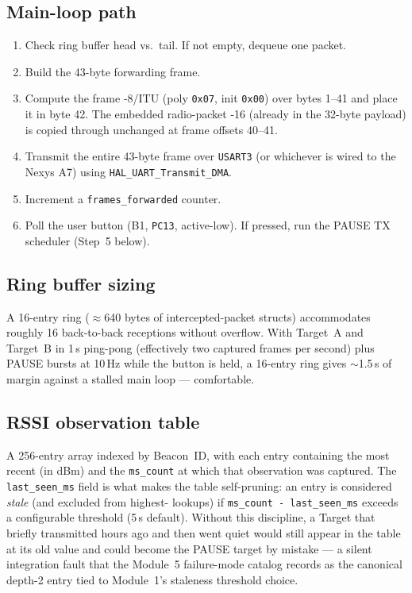 \documentclass[11pt,letterpaper]{article}
\begin{document}
\subsection{Main-loop path}
\begin{enumerate}[leftmargin=2em]
	\item Check ring buffer head vs.\ tail. If not empty, dequeue one packet.
	\item Build the 43-byte forwarding frame.
	\item Compute the frame \CRC{}-8/ITU (poly \texttt{0x07}, init \texttt{0x00}) over bytes 1--41 and place it in byte 42. The embedded radio-packet \CRC{}-16 (already in the 32-byte payload) is copied through unchanged at frame offsets 40--41.
	\item Transmit the entire 43-byte frame over \texttt{USART3} (or whichever \UART{} is wired to the Nexys A7) using \texttt{HAL\_UART\_Transmit\_DMA}.
	\item Increment a \texttt{frames\_forwarded} counter.
	\item Poll the user button (B1, \texttt{PC13}, active-low). If pressed, run the PAUSE TX scheduler (Step~5 below).
\end{enumerate}


\subsection{Ring buffer sizing}
A 16-entry ring ($\approx$640 bytes of intercepted-packet structs) accommodates roughly 16 back-to-back receptions without overflow. With Target~A and Target~B in 1\,s ping-pong (effectively two captured frames per second) plus PAUSE bursts at 10\,Hz while the button is held, a 16-entry ring gives $\sim$1.5\,s of margin against a stalled main loop --- comfortable.

\subsection{RSSI observation table}
A 256-entry array indexed by Beacon~ID, with each entry containing the most recent \RSSI{} (in dBm) and the \texttt{ms\_count} at which that observation was captured. The \texttt{last\_seen\_ms} field is what makes the table self-pruning: an entry is considered \emph{stale} (and excluded from highest-\RSSI{} lookups) if \texttt{ms\_count - last\_seen\_ms} exceeds a configurable threshold (5\,s default). Without this discipline, a Target that briefly transmitted hours ago and then went quiet would still appear in the table at its old \RSSI{} value and could become the PAUSE target by mistake --- a silent integration fault that the Module~5 failure-mode catalog records as the canonical depth-2 entry tied to Module~1's staleness threshold choice.
\end{document}
